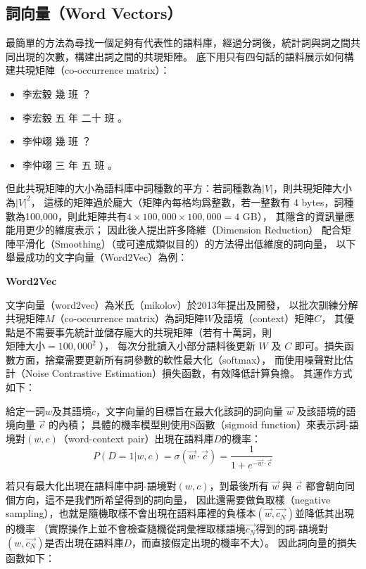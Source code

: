 \subsection{詞向量（Word Vectors）}

最簡單的方法為尋找一個足夠有代表性的語料庫，經過分詞後，統計詞與詞之間共同出現的次數，構建出詞之間的共現矩陣。
底下用只有四句話的語料展示如何構建共現矩陣（co-occurrence matrix）：
\begin{itemize}
\item 李宏毅 幾 班 ？
\item 李宏毅 五 年 二十 班 。
\item 李仲翊 幾 班 ？
\item 李仲翊 三 年 五 班 。
\end{itemize}

但此共現矩陣的大小為語料庫中詞種數的平方：若詞種數為$|V|$，則共現矩陣大小為${|V|}^{2}$，
這樣的矩陣過於龐大（矩陣內每格均爲整數，若一整數有 4 bytes，詞種數為100,000，則此矩陣共有$4 \times 100,000 \times 100,000 = 4$ GB），
其隱含的資訊量應能用更少的維度表示；
因此後人提出許多降維（Dimension Reduction） 配合矩陣平滑化（Smoothing）（或可達成類似目的）的方法得出低維度的詞向量，
以下舉最成功的文字向量（Word2Vec）為例：
\iffalse
這裏舉兩個例子介紹，分別為文字向量（Word2Vec）及全局向量詞表示（GloVe）。
\fi

\vspace{12pt}
\noindent\textbf{Word2Vec}
\vspace{4pt}

文字向量（word2vec）為米氏（mikolov）於2013年提出及開發，
以批次訓練分解共現矩陣$M$（co-occurrence matrix）為詞矩陣$W$及語境（context）矩陣$C$，
其優點是不需要事先統計並儲存龐大的共現矩陣（若有十萬詞，則$\text{矩陣大小} = 100,000^{2} $ ），
每次分批讀入小部分語料後更新 $W$ 及 $C$ 即可。損失函數方面，捨棄需要更新所有詞參數的軟性最大化（softmax），
而使用噪聲對比估計（Noise Contrastive Estimation）損失函數，有效降低計算負擔。
其運作方式如下：

給定一詞$w$及其語境$c$，文字向量的目標旨在最大化該詞的詞向量 $\vec{w}$ 及該語境的語境向量 $\vec{c}$ 的內積；
具體的機率模型則使用S函數（sigmoid function）來表示詞-語境對$(w, c)$（word-context pair）出現在語料庫$D$的機率：
\begin{equation}
P(D=1|w,c) = \sigma (\vec{w} \cdot \vec{c}) = \frac{1}{1 + e^{-\vec{w} \cdot \vec{c}}}
\end{equation}

若只有最大化出現在語料庫中詞-語境對$(w, c)$，到最後所有 $\vec{w}$ 與 $\vec{c}$ 都會朝向同個方向，這不是我們所希望得到的詞向量，
因此還需要做負取樣（negative sampling），也就是隨機取樣不會出現在語料庫裡的負樣本$(\vec{w}, \vec{c_{N}})$並降低其出現的機率
（實際操作上並不會檢查隨機從詞彙裡取樣語境$\vec{c_{N}}$得到的詞-語境對$(w, \vec{c_{N}})$是否出現在語料庫$D$，而直接假定出現的機率不大）。
因此詞向量的損失函數如下：


